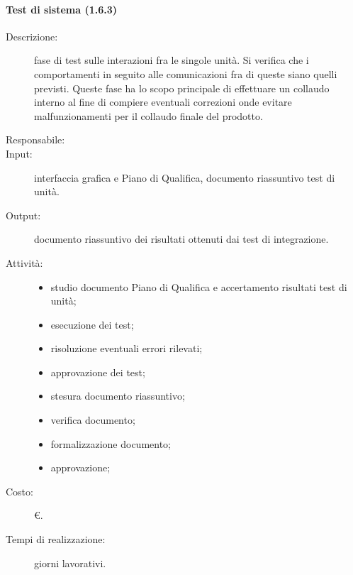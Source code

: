 \paragraph{Test di sistema (1.6.3)}  
\begin{description}
\item[Descrizione:] fase di test sulle interazioni fra le singole unità. Si verifica che i comportamenti in seguito alle comunicazioni fra di queste siano quelli previsti. Queste fase ha lo scopo principale di effettuare un collaudo interno al fine di compiere eventuali correzioni onde evitare malfunzionamenti per il collaudo finale del prodotto.
\item[Responsabile:] 
\item[Input:] interfaccia grafica e Piano di Qualifica, documento riassuntivo test di unità.
\item[Output:] documento riassuntivo dei risultati ottenuti dai test di integrazione.
\item[Attività:]
\begin{itemize}
\item studio documento Piano di Qualifica e accertamento risultati test di unità;
\item esecuzione dei test;
\item risoluzione eventuali errori rilevati;
\item approvazione dei test;
\item stesura documento riassuntivo;
\item verifica documento;
\item formalizzazione documento;
\item approvazione;
\end{itemize}
\item[Costo:] \euro{}.
\item[Tempi di realizzazione:]  giorni lavorativi.
\end{description}

